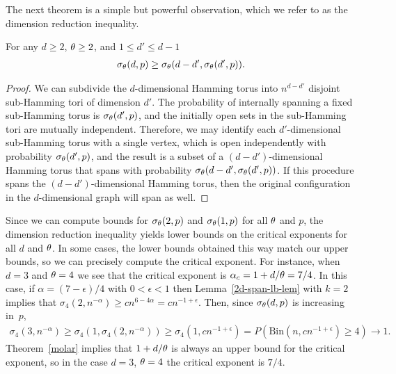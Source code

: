 The next theorem is a simple but powerful observation, which we refer to as the dimension reduction inequality.
\begin{theorem}
\label{dimred-thm}
For any $d\geq 2$, $\theta \geq 2$, and $1\leq d' \leq d-1$
\begin{align}
\label{dim-reduction}
\sigma_{\theta}(d,p) \geq \sigma_{\theta}(d-d',\sigma_{\theta}(d',p)).
\end{align}
\end{theorem}
\begin{proof}
We can subdivide the $d$-dimensional Hamming torus into $n^{d-d'}$ disjoint sub-Hamming tori of dimension $d'$.  The probability of internally spanning a fixed sub-Hamming torus is $\sigma_{\theta}(d',p)$, and the initially open sets in the sub-Hamming tori are mutually independent.  Therefore, we may identify each $d'$-dimensional sub-Hamming torus with a single vertex, which is open independently with probability $\sigma_\theta(d',p)$, and the result is a subset of a $(d-d')$-dimensional Hamming torus that spans with probability $\sigma_\theta(d-d',\sigma_\theta(d',p))$.  If this procedure spans the $(d-d')$-dimensional Hamming torus, then the original configuration in the $d$-dimensional graph will span as well.
\end{proof}

Since we can compute bounds for $\sigma_{\theta}(2,p)$ and $\sigma_{\theta}(1,p)$ for all $\theta$ and $p$, the dimension reduction inequality yields lower bounds on the critical exponents for all $d$ and $\theta$.  In some cases, the lower bounds obtained this way match our upper bounds, so we can precisely compute the critical exponent.  For instance, when $d = 3$ and $\theta=4$ we see that the critical exponent is $\alpha_c = 1+d/\theta = 7/4$.  In this case, if $\alpha  = (7-\epsilon)/4$ with $0<\epsilon <1$ then Lemma~\ref{2d-span-lb-lem} with $k=2$ implies that $\sigma_{4}(2,n^{-\alpha}) \geq cn^{6 - 4\alpha} = cn^{-1+\epsilon}$.  Then, since $\sigma_\theta(d,p)$ is increasing in~$p$,
\begin{align*}
\sigma_4(3,n^{-\alpha}) \geq \sigma_4(1,\sigma_4(2,n^{-\alpha})) \geq \sigma_4(1, c n^{-1+\epsilon})  = P( \text{Bin}(n, cn^{-1+\epsilon}) \geq 4) \to 1.
\end{align*}
Theorem~\ref{molar} implies that $1+d/\theta$ is always an upper bound for the critical exponent, so in the case $d=3$, $\theta=4$ the critical exponent is $7/4$.

